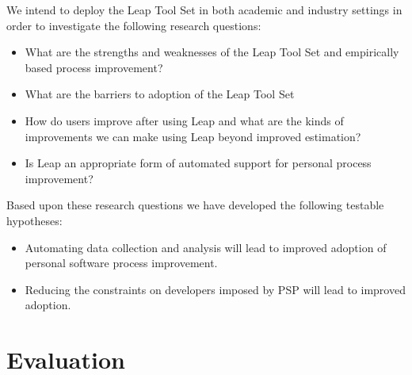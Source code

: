 We intend to deploy the Leap Tool Set in both academic and industry
settings in order to investigate the following research questions:
\begin{itemize}
  
\item{What are the strengths and weaknesses of the Leap Tool Set and
    empirically based process improvement?}

\item{What are the barriers to adoption of the Leap Tool Set}
  

\item{How do users improve after using Leap and what are the kinds of
    improvements we can make using Leap beyond improved estimation?}

  
\item{Is Leap an appropriate form of automated support for personal process
    improvement?}

\end{itemize}

Based upon these research questions we have developed the following 
testable hypotheses:
\begin{itemize}
\item{Automating data collection and analysis will lead to improved
    adoption of personal software process improvement.}

\item {Reducing the constraints on developers imposed by PSP will lead to
    improved adoption.}
  
\end{itemize}

\section*{Evaluation}

